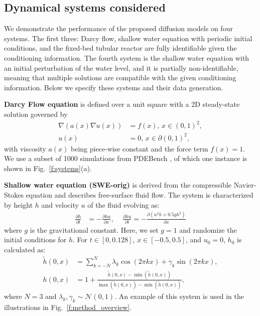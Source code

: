 \documentclass{article}
\newcommand{\dd}[2]{\frac{\partial #1} {\partial #2}}
\begin{document}
\subsection{Dynamical systems considered}
We demonstrate the performance of the proposed diffusion models on four systems. The first three: Darcy flow, shallow water equation with periodic initial conditions, and the fixed-bed tubular reactor are fully identifiable given the conditioning information. The fourth system is the shallow water equation with an initial perturbation of the water level, and it is partially non-identifiable, meaning that multiple solutions are compatible with the given conditioning information. Below we specify these systems and their data generation.

\textbf{Darcy Flow equation} is defined over a unit square with a 2D steady-state solution governed by
\begin{align}
     \nabla \left(a(x) \nabla u(x)\right) &= f(x) \text{, } x \in (0, 1)^2, \\
     u(x) &= 0 \text{, } x \in \partial(0, 1)^2,
    \label{eq:darcy}
\end{align}
with viscosity $a(x)$ being piece-wise constant and the force term $f(x) =1$. We use a subset of 1000 simulations from PDEBench \cite{takamoto2022pdebench}, of which one instance is shown in Fig.~\ref{f:systems}(a).


\textbf{Shallow water equation (SWE-orig)} is derived from the compressible Navier-Stokes equation and describes free-surface fluid flow. The system is characterized by height $h$ and velocity $u$ of the fluid evolving as:
\begin{align}
    \dd{h}{t} &= -\dd{hu}{x} \text{, } \quad \dd{hu}{t} = -\dd{(u^2h + 0.5gh^2)}{x}
    \label{eq:swe}
\end{align}
where $g$ is the gravitational constant. Here, we set $g=1$ and randomize the initial conditions for $h$. For $t \in [0, 0.128]$, $x \in [-0.5, 0.5]$, and  $u_0=0$, $h_0$ is calculated as:
\begin{align}
    \tilde{h}(0, x) &= \sum_{k=-N}^{N} \lambda_k \cos(2 \pi k x) + \gamma_k \sin(2\pi k x), \\
    h(0, x) &= 1 + \frac{\tilde{h}(0, x) - \min(\tilde{h}(0, x))}{\max(\tilde{h}(0, x)) - \min(\tilde{h}(0, x))} \text{,}
    \label{eq:swe_ic_period}
\end{align}
where $N=3$ and $\lambda_k, \gamma_k \sim \mathcal{N}(0, 1)$. An example of this system is used in the illustrations in Fig.~\ref{f:method_overview}.
\end{document}
